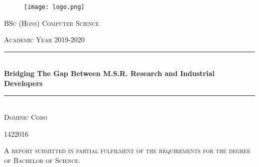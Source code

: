 \documentclass[a4paper, 10pt]{report}
\newcommand{\fypCourse}{BSc (Hons) Computer Science}
\newcommand{\fypStudent}{Dominic Cobo}
\newcommand{\fypStudentId}{1422016}
\newcommand{\fypAcademicYear}{2019-2020}
\newcommand{\fypTitle}{Bridging The Gap Between M.S.R. Research and Industrial Developers}
\begin{document}
	\begin{titlepage}
		\centering
		\begin{figure}
			\texttt{[image: logo.png]}
		\end{figure}
		\textsc{\LARGE \fypCourse}
		
		\textsc{\large Academic Year \fypAcademicYear}
		
		\rule{\linewidth}{0.5mm} \\[0.5cm]
		{ \huge\textbf { \fypTitle } } \\
		\rule{\linewidth}{0.5mm} \\[6cm]
		
		
		\textsc{\huge \fypStudent}
		
		\textsc{\large \fypStudentId}
		
		\bigskip
		
		\textsc{\large A report submitted in partial fulfilment of the requirements for the degree of Bachelor of Science.}
		
	\end{titlepage}
	
	\newpage
	
	
	
	
	
	
	
	
	
	
	
\end{document}
